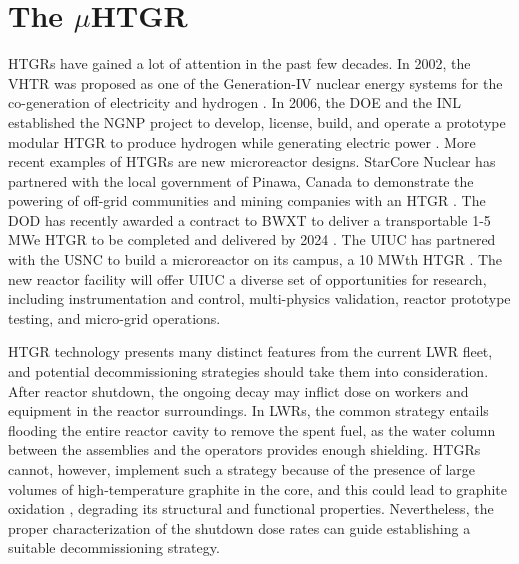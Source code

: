 \section{The $\mu$HTGR}
\label{sec:micro}


\Glspl*{HTGR} have gained a lot of attention in the past few decades.
In 2002, the \gls*{VHTR} was proposed as one of the Generation-IV nuclear energy systems for the co-generation of electricity and hydrogen \cite{doe_vhtr_2002}.
In 2006, the \gls*{DOE} and the \gls*{INL} established the \gls*{NGNP} project to develop, license, build, and operate a prototype modular \gls*{HTGR} to produce hydrogen while generating electric power \cite{ngnp}.
More recent examples of HTGRs are new microreactor designs.
StarCore Nuclear has partnered with the local government of Pinawa, Canada to demonstrate the powering of off-grid communities and mining companies with an HTGR \cite{starcore}.
The \gls*{DOD} has recently awarded a contract to BWXT to deliver a transportable 1-5 MWe HTGR to be completed and delivered by 2024 \cite{bwxt}.
The \gls*{UIUC} has partnered with the \gls*{USNC} to build a microreactor on its campus, a 10 MWth \gls*{HTGR} \cite{uiuc-mmr2}.
The new reactor facility will offer UIUC a diverse set of opportunities for research, including instrumentation and control, multi-physics validation, reactor prototype testing, and micro-grid operations.

HTGR technology presents many distinct features from the current \gls*{LWR} fleet, and potential decommissioning strategies should take them into consideration.
After reactor shutdown, the ongoing decay may inflict dose on workers and equipment in the reactor surroundings.
In \glspl*{LWR}, the common strategy entails flooding the entire reactor cavity to remove the spent fuel, as the water column between the assemblies and the operators provides enough shielding.
HTGRs cannot, however, implement such a strategy because of the presence of large volumes of high-temperature graphite in the core, and this could lead to graphite oxidation \cite{oxidation}, degrading its structural and functional properties.
Nevertheless, the proper characterization of the shutdown dose rates can guide establishing a suitable decommissioning strategy.


